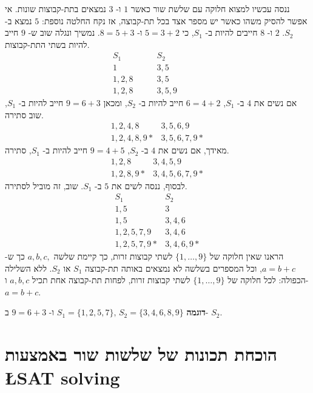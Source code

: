 \documentclass[12pt,a4paper]{article}
\begin{document}
ננסה עכשיו למצוא חלוקה עם שלשת שור כאשר 
$1$
ו-%
$3$
נמצאים בתת-קבוצות שונות. אי אפשר להסיק משהו כאשר יש מספר אצד בכל תת-קבוצה, אז נקח החלטה נוספת: 
$5$
נמצא ב-%
$S_2$.
$2$
ו-%
$8$
חייבים להיות ב-%
$S_1$,
כי
$5=3+2$
ו-%
$8=5+3$.
נמשיך ונגלה שוב ש-%
$9$
חייב להיות בשתי התת-קבוצות.
\begin{displaymath}
\begin{array}{ll}
S_1 & S_2\\
1 & 3,5\\
1,2,8&3,5\\
1,2,8\quad\quad &3,5,9\quad\quad\quad
\end{array}
\end{displaymath}
אם נשים את
$4$
ב-%
$S_1$,
$6=4+2$
חייב להיות ב-%
$S_2$,
ומכאן
$9=6+3$
חייב להיות ב-%
$S_1$,
שוב סתירה.
\begin{displaymath}
\begin{array}{ll}
1,2,4,8&3,5,6,9\\
1,2,4,8,9*&3,5,6,7,9*
\end{array}
\end{displaymath}
מאידך, אם נשים את
$4$
ב-%
$S_2$,
$9=4+5$
חייב להיות ב-%
$S_1$,
סתירה.
\begin{displaymath}
\begin{array}{ll}
1,2,8&3,4,5,9\\
1,2,8,9*&3,4,5,6,7,9*
\end{array}
\end{displaymath}
לבסוף,
ננסה לשים את 
$5$
ב-%
$S_1$.
שוב, זה מוביל לסתירה.
\begin{displaymath}
\begin{array}{ll}
S_1 & S_2\\
1,5& 3\\
1,5&3,4,6\\
1,2,5,7,9&3,4,6\\
1,2,5,7,9*&3,4,6,9*
\end{array}
\end{displaymath}
הראנו שאין חלוקה של
$\{1,\ldots,9\}$
לשתי קבוצות זרות, כך קיימת שלשה 
$a,b,c,$
כך ש-%
$a=b+c$,
וכל המספרים בשלשה לא נמצאים באותה תת-קבוצה
$S_1$
או
$S_2$.
ללא השלילה הכפולה: לכל חלוקה של 
$\{1,\ldots,9\}$
לשתי קבוצות זרות, לפחות תת-קבוצה אחת תכיל 
$a,b,c$
ו-%
$a=b+c$.

\textbf{דוגמה}
$S_1=\{1,2,5,7\},\, S_2=\{3,4,6,8,9\}$
ו-%
$9=6+3$
ב-%
$S_2$.

\section{הוכחת תכונות של שלשות שור באמצעות \L{SAT solving}}
\end{document}
